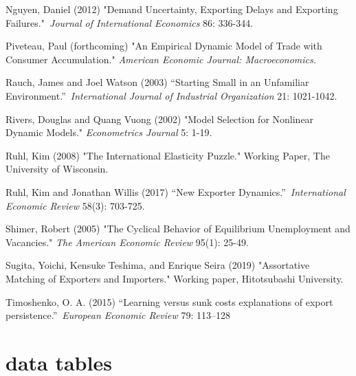 \documentclass[12pt]{article}
\begin{document}
\begin{description}
\item Nguyen, Daniel (2012) "Demand Uncertainty, Exporting Delays and
Exporting Failures."\textit{\ Journal of International Economics }86:
336-344.

\item Piveteau, Paul (forthcoming) "An Empirical Dynamic Model of Trade with
Consumer Accumulation." \textit{American Economic Journal: Macroeconomics.}

\item Rauch, James and Joel Watson (2003) \textquotedblleft Starting Small
in an Unfamiliar Environment.\textquotedblright\ \textit{International
Journal of Industrial Organization} 21: 1021-1042.

\item Rivers, Douglas and Quang Vuong (2002) "Model Selection for Nonlinear
Dynamic Models." \textit{Econometrics Journal} 5: 1-19.

\item Ruhl, Kim (2008) "The International Elasticity Puzzle." Working Paper,
The University of Wisconsin.

\item Ruhl, Kim and Jonathan Willis (2017) \textquotedblleft New Exporter
Dynamics.\textquotedblright\ \textit{International Economic Review} 58(3):
703-725.

\item Shimer, Robert (2005) "The Cyclical Behavior of Equilibrium
Unemployment and Vacancies." \textit{The American Economic Review} 95(1):
 25-49.

\item Sugita, Yoichi, Kensuke Teshima, and Enrique Seira (2019) "Assortative
Matching of Exporters and Importers." Working paper, Hitotsubashi University.

\item Timoshenko, O. A. (2015) \textquotedblleft Learning versus sunk costs
explanations of export persistence.\textquotedblright\ \textit{European
Economic Review} 79: 113--128\pagebreak
\end{description}

\appendix

\section{data tables}

\label{sec:data_tables}
\end{document}
